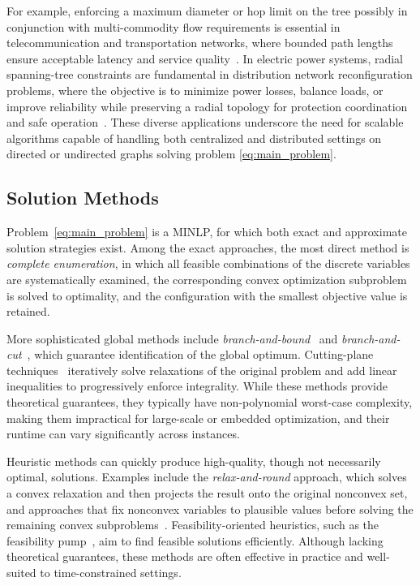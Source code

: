 \documentclass[11pt,a4paper]{article}
\theoremstyle{plain}
\theoremstyle{definition}
\theoremstyle{remark}
\begin{document}
	For example, enforcing a maximum diameter or hop limit on the tree possibly in conjunction with multi-commodity flow requirements is essential in telecommunication and transportation networks, where bounded path lengths ensure acceptable latency and service quality~\cite{gouveia1996multicommodity,gouveia2003network,dahl2006formulations,magnanti1981combinatorial}. In electric power systems, radial spanning-tree constraints are fundamental in distribution network reconfiguration problems, where the objective is to minimize power losses, balance loads, or improve reliability while preserving a radial topology for protection coordination and safe operation~\cite{baran1989network,shen2019distributed,nejad2020scalable-bis,lopez2023enhanced,mokhtari2025alternating,mokhtari2025distributed}. These diverse applications underscore the need for scalable algorithms capable of handling both centralized and distributed settings on directed or undirected graphs solving problem \eqref{eq:main_problem}.
	
	\subsection{Solution Methods}
	Problem~\eqref{eq:main_problem} is a MINLP, for which both exact and approximate solution strategies exist. Among the exact approaches, the most direct method is \emph{complete enumeration}, in which all feasible combinations of the discrete variables are systematically examined, the corresponding convex optimization subproblem is solved to optimality, and the configuration with the smallest objective value is retained.
	
	More sophisticated global methods include \emph{branch-and-bound}~\cite{lawler1966branch,morrison2016branch} and \emph{branch-and-cut}~\cite{stubbs1999branch,mitchell2002branch}, which guarantee identification of the global optimum. Cutting-plane techniques~\cite{gomory1958algorithm,chvatal1989cutting} iteratively solve relaxations of the original problem and add linear inequalities to progressively enforce integrality. While these methods provide theoretical guarantees, they typically have non-polynomial worst-case complexity, making them impractical for large-scale or embedded optimization, and their runtime can vary significantly across instances.
	
	Heuristic methods can quickly produce high-quality, though not necessarily optimal, solutions. Examples include the \emph{relax-and-round} approach, which solves a convex relaxation and then projects the result onto the original nonconvex set, and approaches that fix nonconvex variables to plausible values before solving the remaining convex subproblems~\cite{boyd-biconvex}. Feasibility-oriented heuristics, such as the feasibility pump~\cite{achterberg2007improving,fischetti2005feasibility}, aim to find feasible solutions efficiently. Although lacking theoretical guarantees, these methods are often effective in practice and well-suited to time-constrained settings.
	
\end{document}
